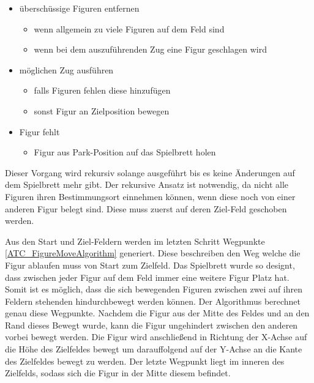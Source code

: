 \begin{itemize}
\tightlist
\item
  überschüssige Figuren entfernen

  \begin{itemize}
  \tightlist
  \item
    wenn allgemein zu viele Figuren auf dem Feld sind
  \item
    wenn bei dem auszuführenden Zug eine Figur geschlagen wird
  \end{itemize}
\item
  möglichen Zug ausführen

  \begin{itemize}
  \tightlist
  \item
    falls Figuren fehlen diese hinzufügen
  \item
    sonst Figur an Zielposition bewegen
  \end{itemize}
\item
  Figur fehlt

  \begin{itemize}
  \tightlist
  \item
    Figur aus Park-Position auf das Spielbrett holen
  \end{itemize}
\end{itemize}

Dieser Vorgang wird rekursiv solange ausgeführt bis es keine Änderungen
auf dem Spielbrett mehr gibt. Der rekursive Ansatz ist notwendig, da
nicht alle Figuren ihren Bestimmungsort einnehmen können, wenn diese
noch von einer anderen Figur belegt sind. Diese muss zuerst auf deren
Ziel-Feld geschoben werden.

Aus den Start und Ziel-Feldern werden im letzten Schritt Wegpunkte
\ref{ATC_FigureMoveAlgorithm} generiert. Diese beschreiben den Weg
welche die Figur ablaufen muss von Start zum Zielfeld. Das Spielbrett
wurde so designt, dass zwischen jeder Figur auf dem Feld immer eine
weitere Figur Platz hat. Somit ist es möglich, dass die sich bewegenden
Figuren zwischen zwei auf ihren Feldern stehenden hindurchbewegt werden
können. Der Algorithmus berechnet genau diese Wegpunkte. Nachdem die
Figur aus der Mitte des Feldes und an den Rand dieses Bewegt wurde, kann
die Figur ungehindert zwischen den anderen vorbei bewegt werden. Die
Figur wird anschließend in Richtung der X-Achse auf die Höhe des
Zielfeldes bewegt um darauffolgend auf der Y-Achse an die Kante des
Zielfeldes bewegt zu werden. Der letzte Wegpunkt liegt im inneren des
Zielfelds, sodass sich die Figur in der Mitte diesem befindet.


